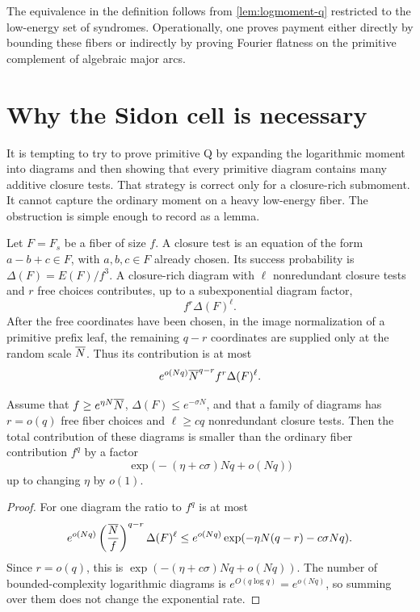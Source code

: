 \documentclass[11pt,a4paper]{amsart}
\numberwithin{equation}{section}
\theoremstyle{remark}
\begin{document}
The equivalence in the definition follows from \cref{lem:logmoment-q} restricted to the low-energy set of syndromes.  Operationally, one proves payment either directly by bounding these fibers or indirectly by proving Fourier flatness on the primitive complement of algebraic major arcs.


\section{Why the Sidon cell is necessary}\label{sec:sidon-necessity}

It is tempting to try to prove primitive Q by expanding the logarithmic moment into diagrams and then showing that every primitive diagram contains many additive closure tests.  That strategy is correct only for a closure-rich submoment.  It cannot capture the ordinary moment on a heavy low-energy fiber.  The obstruction is simple enough to record as a lemma.

Let \(F=F_s\) be a fiber of size \(f\).  A closure test is an equation of the form \(a-b+c\in F\), with \(a,b,c\in F\) already chosen.  Its success probability is \(\Delta(F)=E(F)/f^3\).  A closure-rich diagram with \(\ell\) nonredundant closure tests and \(r\) free choices contributes, up to a subexponential diagram factor,
\[
        f^r\Delta(F)^\ell .
\]
After the free coordinates have been chosen, in the image normalization of a primitive prefix leaf, the remaining \(q-r\) coordinates are supplied only at the random scale \(\overline N\).  Thus its contribution is at most
\[
        e^{o(Nq)}\overline N^{q-r}f^r\Delta(F)^\ell .
\]

\begin{lemma}\label{lem:no-go}
Assume that \(f\ge e^{\eta N}\overline N\), \(\Delta(F)\le e^{-\sigma N}\), and that a family of diagrams has \(r=o(q)\) free fiber choices and \(\ell\ge c q\) nonredundant closure tests.  Then the total contribution of these diagrams is smaller than the ordinary fiber contribution \(f^q\) by a factor
\[
        \exp\bigl(-(\eta+c\sigma)Nq+o(Nq)\bigr)
\]
up to changing \(\eta\) by \(o(1)\).
\end{lemma}

\begin{proof}
For one diagram the ratio to \(f^q\) is at most
\[
        e^{o(Nq)}\left(\frac{\overline N}{f}\right)^{q-r}\Delta(F)^\ell
        \le e^{o(Nq)}\exp(-\eta N(q-r)-c\sigma Nq).
\]
Since \(r=o(q)\), this is \(\exp(-(\eta+c\sigma)Nq+o(Nq))\).  The number of bounded-complexity logarithmic diagrams is \(e^{O(q\log q)}=e^{o(Nq)}\), so summing over them does not change the exponential rate.
\end{proof}
\end{document}
